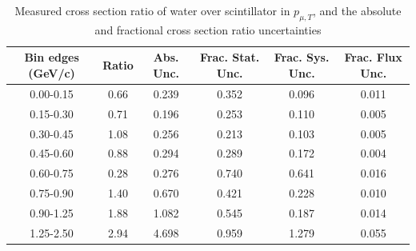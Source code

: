 \documentclass[../main.tex]{subfiles}
\begin{document}
\begin{table}
  \centering
  \renewcommand{\arraystretch}{1.15}
  \caption{Systematic covariance matrix of measured cross section ratio of water over scintillator in $p_{\mu,||}$}
  \label{tbl:rationucleonnuc10muon_pzc}
\end{table}
\begin{table}
  \centering
  \renewcommand{\arraystretch}{1.15}
  \caption{Measured cross section ratio of water over scintillator in $p_{\mu,T}$, and the absolute and fractional cross section ratio uncertainties}
    \begin{tabular}{c||c|c||c|c|c}
      Bin edges (GeV/c) &  Ratio  &  Abs. Unc.  &  Frac. Stat. Unc.  &  Frac. Sys. Unc.  &  Frac. Flux Unc. \\
      \hline
      \hline
      0.00-0.15 & 0.66 & 0.239 & 0.352 & 0.096 & 0.011\\
      0.15-0.30 & 0.71 & 0.196 & 0.253 & 0.110 & 0.005\\
      0.30-0.45 & 1.08 & 0.256 & 0.213 & 0.103 & 0.005\\
      0.45-0.60 & 0.88 & 0.294 & 0.289 & 0.172 & 0.004\\
      0.60-0.75 & 0.28 & 0.276 & 0.740 & 0.641 & 0.016\\
      0.75-0.90 & 1.40 & 0.670 & 0.421 & 0.228 & 0.010\\
      0.90-1.25 & 1.88 & 1.082 & 0.545 & 0.187 & 0.014\\
      1.25-2.50 & 2.94 & 4.698 & 0.959 & 1.279 & 0.055
    \end{tabular}
  \label{tbl:rationucleonnuc10muon_pta}
\end{table}
\end{document}
